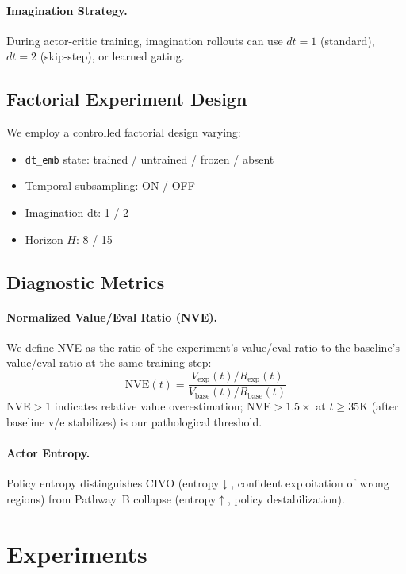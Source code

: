 \documentclass[letterpaper]{article}
\begin{document}
\paragraph{Imagination Strategy.}
During actor-critic training, imagination rollouts can use $dt{=}1$ (standard), $dt{=}2$ (skip-step), or learned gating.

\subsection{Factorial Experiment Design}

We employ a controlled factorial design varying:
\begin{itemize}[nosep]
    \item \texttt{dt\_emb} state: trained / untrained / frozen / absent
    \item Temporal subsampling: ON / OFF
    \item Imagination dt: 1 / 2
    \item Horizon $H$: 8 / 15
\end{itemize}

\subsection{Diagnostic Metrics}

\paragraph{Normalized Value/Eval Ratio (NVE).}
We define NVE as the ratio of the experiment's value/eval ratio to the baseline's value/eval ratio at the same training step:
\[
\text{NVE}(t) = \frac{V_{\text{exp}}(t) / R_{\text{exp}}(t)}{V_{\text{base}}(t) / R_{\text{base}}(t)}
\]
NVE$>1$ indicates relative value overestimation; NVE$>1.5\times$ at $t \geq 35$K (after baseline v/e stabilizes) is our pathological threshold.

\paragraph{Actor Entropy.}
Policy entropy distinguishes CIVO (entropy$\downarrow$, confident exploitation of wrong regions) from Pathway~B collapse (entropy$\uparrow$, policy destabilization).

\section{Experiments}
\end{document}
